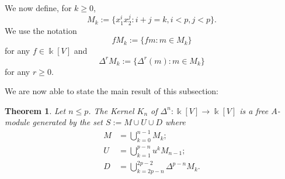 \documentclass[a4paper]{amsart}
\newcommand{\kk}{\Bbbk}
\newtheorem{Theorem}[Lemma]{Theorem}
\newtheorem*{Corollary of Conjecture}{Corollary of Conjecture}
\theoremstyle{definition}
\theoremstyle{remark}
\theoremstyle{Acknowledgments}
\begin{document}
We now define, for $k \geq 0$,
\[M_k:= \{x_1^ix_2^j: i+j=k, i<p, j<p\}.\]
We use the notation
\[fM_k :=\{fm: m \in M_k\}\]
for any $f \in \kk[V]$ and
\[\Delta^rM_k:= \{\Delta^r(m): m \in M_k\} \] for any $r \geq 0$.

We are now able to state the main result of this subsection:

\begin{Theorem} Let $n \leq p$. The Kernel $K_n$ of $\Delta^n: \kk[V] \rightarrow \kk[V]$ is a free $A$-module generated by the set $S:= M \cup U \cup D$ where
\begin{align*}
M &= \bigcup_{k=0}^{n-1} M_k;\\
U &= \bigcup_{k=1}^{p-n} u^kM_{n-1};\\
D &= \bigcup_{k=2p-n}^{2p-2} \Delta^{p-n}M_k. 
\end{align*}
\end{Theorem}
\end{document}
